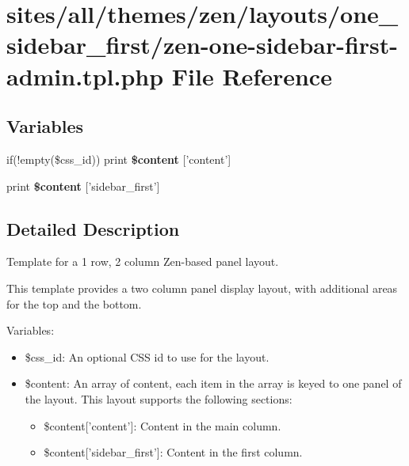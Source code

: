 \hypertarget{zen-one-sidebar-first-admin_8tpl_8php}{
\section{sites/all/themes/zen/layouts/one\_\-sidebar\_\-first/zen-one-sidebar-first-admin.tpl.php File Reference}
\label{zen-one-sidebar-first-admin_8tpl_8php}
}
\subsection*{Variables}
\begin{CompactItemize}
\item 
\hypertarget{zen-one-sidebar-first-admin_8tpl_8php_16767ac2e2b027ec00a0c12535d2ba7a}{
if(!empty(\$css\_\-id)) print \textbf{\$content} \mbox{[}'content'\mbox{]}}
\label{zen-one-sidebar-first-admin_8tpl_8php_16767ac2e2b027ec00a0c12535d2ba7a}

\item 
\hypertarget{zen-one-sidebar-first-admin_8tpl_8php_8fbe76276dfb5a084cc042c32e8e6394}{
print \textbf{\$content} \mbox{[}'sidebar\_\-first'\mbox{]}}
\label{zen-one-sidebar-first-admin_8tpl_8php_8fbe76276dfb5a084cc042c32e8e6394}

\end{CompactItemize}


\subsection{Detailed Description}
Template for a 1 row, 2 column Zen-based panel layout.

This template provides a two column panel display layout, with additional areas for the top and the bottom.

Variables:\begin{itemize}
\item \$css\_\-id: An optional CSS id to use for the layout.\item \$content: An array of content, each item in the array is keyed to one panel of the layout. This layout supports the following sections:\begin{itemize}
\item \$content\mbox{[}'content'\mbox{]}: Content in the main column.\item \$content\mbox{[}'sidebar\_\-first'\mbox{]}: Content in the first column. \end{itemize}
\end{itemize}
